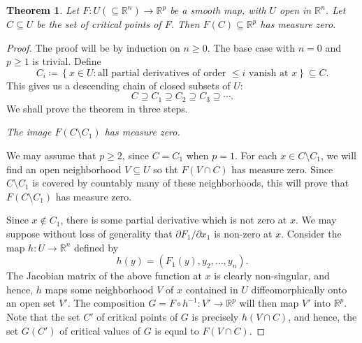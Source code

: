 \documentclass[11pt]{article}
\theoremstyle{thmstyle}
\newtheorem{theorem}{Theorem}[section]
\theoremstyle{defstyle}
\newcommand{\R}{\mathbb{R}}
\renewcommand{\le}{\leqslant}
\renewcommand{\ge}{\geqslant}
\begin{document}
\begin{theorem}
    Let $F\colon U(\subseteq\R^n)\to\R^p$ be a smooth map, with $U$ open in $\R^n$. Let $C\subseteq U$ be the set of critical points of $F$. Then $F(C)\subseteq\R^p$ has measure zero.
\end{theorem}
\begin{proof}
    The proof will be by induction on $n\ge 0$. The base case with $n = 0$ and $p\ge 1$ is trivial. Define 
    \begin{equation*}
        C_i\coloneq\left\{x\in U\colon\text{all partial derivatives of order $\le i$ vanish at $x$}\right\}\subseteq C.
    \end{equation*}
    This gives us a descending chain of closed subsets of $U$: 
    \begin{equation*}
        C\supseteq C_1\supseteq C_2\supseteq C_3\supseteq\cdots.
    \end{equation*}
    We shall prove the theorem in three steps. 

     \emph{The image $F(C\setminus C_1)$ has measure zero.}

	We may assume that $p\ge 2$, since $C = C_1$ when $p = 1$. For each $x\in C\setminus C_1$, we will find an open neighborhood $V\subseteq U$ so tht $F(V\cap C)$ has measure zero. Since $C\setminus C_1$ is covered by countably many of these neighborhoods, this will prove that $F(C\setminus C_1)$ has measure zero.

	Since $x\notin C_1$, there is some partial derivative which is not zero at $x$. We may suppose without loss of generality that $\partial F_1/\partial x_1$ is non-zero at $x$. Consider the map $h\colon U\to\R^n$ defined by 
	\begin{equation*}
		h(y) = \left(F_1(y), y_2,\dots, y_n\right).
	\end{equation*}
	The Jacobian matrix of the above function at $x$ is clearly non-singular, and hence, $h$ maps some neighborhood $V$ of $x$ contained in $U$ diffeomorphically onto an open set $V'$. The composition $G = F\circ h^{-1}\colon V'\to\R^p$ will then map $V'$ into $\R^p$. Note that the set $C'$ of critical points of $G$ is precisely $h(V\cap C)$, and hence, the set $G(C')$ of critical values of $G$ is equal to $F(V\cap C)$.


\end{proof}
\end{document}

